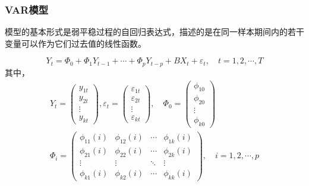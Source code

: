 \documentclass[a4paper,AutoFakeBold,AutoFakeSlant]{ctexart}
\begin{document}
\subsubsection{VAR模型}
模型的基本形式是弱平稳过程的自回归表达式，描述的是在同一样本期间内的若干变量可以作为它们过去值的线性函数。

\begin{equation}
  Y_{t}=\Phi_{0}+\Phi_{1} Y_{t-1}+\cdots+\Phi_{p} Y_{t-p}+B X_{t}+\varepsilon_{t}, \quad t=1,2, \cdots, T
\end{equation}
其中，
\begin{equation*}
  \begin{array}{c}
    Y_{t}=\left(\begin{array}{c}
    y_{1 t} \\
    y_{2 t} \\
    \vdots \\
    y_{k t}
    \end{array}\right), \varepsilon_{t}=\left(\begin{array}{c}
    \varepsilon_{1 t} \\
    \varepsilon_{2 t} \\
    \vdots \\
    \varepsilon_{k t}
    \end{array}\right), \quad \Phi_{0}=\left(\begin{array}{c}
    \phi_{10} \\
    \phi_{20} \\
    \vdots \\
    \phi_{k 0}
    \end{array}\right) \\

    \Phi_{i}=\left(\begin{array}{cccc}
    \phi_{11}(i) & \phi_{12}(i) & \cdots & \phi_{1 k}(i) \\
    \phi_{21}(i) & \phi_{22}(i) & \cdots & \phi_{2 k}(i) \\
    \vdots & \vdots & \ddots & \vdots \\
    \phi_{k 1}(i) & \phi_{k 2}(i) & \cdots & \phi_{k k}(i)
    \end{array}\right), \quad i=1,2, \cdots, p
    \end{array}
\end{equation*}
\end{document}

